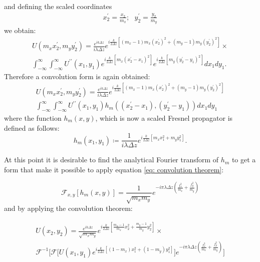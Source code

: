\documentclass{iucr}              %
\begin{document}
and defining the scaled coordinates 
\begin{align} \label{scaled coordinates}
x_2^{\prime} = \frac{x_2}{m_x} ; ~~~ y_2^{\prime} = \frac{y_2}{m_y}
\end{align}
we obtain:
\begin{multline} \label{eq: substitution of scaled coordinates in integral}
U(m_x x_2^{\prime}, m_y y_2^{\prime}) = \frac { e^{ik\Delta z }}{ i \lambda \Delta z}e^{i \frac{k}{2 \Delta z} [(m_x - 1)m_x(x_2^{\prime})^2 + (m_y - 1)m_y(y_2^{\prime})^2]} \times \\
\int_{-\infty}^{\infty} \int_{-\infty}^{\infty} U^{\prime \prime}(x_1, y_1) 
e^{i \frac{k}{2 \Delta z} [m_x (x_2^{\prime}-x_1)^2]}
e^{i \frac{k}{2 \Delta z}[m_y (y_2^{\prime}-y_1)^2]} dx_1 dy_1.
\end{multline}
Therefore a convolution form is again obtained:
\begin{multline} \label{eq: convolution form of zoom propagation}
U(m_x x_2^{\prime}, m_y y_2^{\prime}) = \frac {e^{ik\Delta z }}{ i \lambda \Delta z} e^{i \frac{k}{2 \Delta z} [(m_x - 1)m_x(x_2^{\prime})^2 + (m_y - 1)m_y(y_2^{\prime})^2]}\\ \int_{-\infty}^{\infty} \int_{-\infty}^{\infty} U^{\prime \prime}(x_1, y_1) h_m((x_2^{\prime}-x_1),(y_2^{\prime}-y_1)) dx_1 dy_1
\end{multline}
where the function $h_m(x,y)$, which is now a scaled Fresnel propagator is defined as follows:
\begin{equation} \label{eq: scaled Fresnel propagator}
h_m(x_1 ,y_1) \coloneqq \frac {1}{ i \lambda \Delta z} e^{i \frac{k}{2 \Delta z} [m_x x_1^2 +m_y y_1^2]}.
\end{equation}

At this point it is desirable to find the analytical Fourier transform of $h_m$ to get a form that make it possible to apply equation \ref{eq: convolution theorem}:

\begin{equation} \label{eq: Fourier transform of Scaled propagator}
\mathcal{F}_{x,y} [h_m(x,y)] = \frac{1}{\sqrt{m_x m_y}} e^{-i \pi \lambda \Delta z (\frac{f_x^2}{m_x} +\frac{f_y^2}{m_y})}
\end{equation}
and by applying the convolution theorem:

\begin{multline}
\label{eq: final form of Fresnel zoom in convolution form}
U(x_2, y_2) = \frac { e^{ik\Delta z }}{\sqrt{m_x m_y} }e^{i \frac{k}{2 \Delta z} [\frac{m_x - 1}{m_x}x_2^2 + \frac{m_y - 1}{m_y}y_2^2]} \times \\
\mathcal{F}^{-1}\Big[\mathcal{F}\big[U(x_1, y_1)e^{i \frac{k}{2 \Delta z} [(1-m_x)x_1^2 + (1-m_y)y_1^2]}\big]
e^{-i \pi \lambda \Delta z (\frac{f_x^2}{m_x} +\frac{f_y^2}{m_y})}\Big]
\end{multline}
\end{document}
